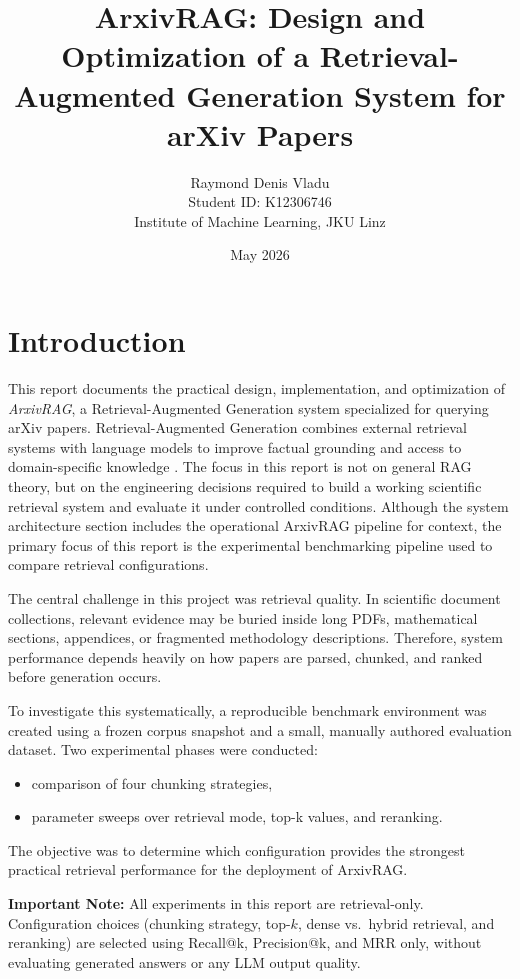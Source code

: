 \documentclass[a4paper,12pt]{article}
\title{ArxivRAG: Design and Optimization of a Retrieval-Augmented Generation System for arXiv Papers}
\author{
Raymond Denis Vladu \\
Student ID: K12306746 \\
Institute of Machine Learning, JKU Linz
}
\date{May 2026}
\begin{document}
\maketitle
\tableofcontents

\newpage

\section{Introduction}

This report documents the practical design, implementation, and optimization of \textit{ArxivRAG}, a Retrieval-Augmented Generation system specialized for querying arXiv papers. Retrieval-Augmented Generation combines external retrieval systems with language models to improve factual grounding and access to domain-specific knowledge \cite{lewis2020rag}. The focus in this report is not on general RAG theory, but on the engineering decisions required to build a working scientific retrieval system and evaluate it under controlled conditions. Although the system architecture section includes the operational ArxivRAG pipeline for context, the primary focus of this report is the experimental benchmarking pipeline used to compare retrieval configurations.

The central challenge in this project was retrieval quality. In scientific document collections, relevant evidence may be buried inside long PDFs, mathematical sections, appendices, or fragmented methodology descriptions. Therefore, system performance depends heavily on how papers are parsed, chunked, and ranked before generation occurs.

To investigate this systematically, a reproducible benchmark environment was created using a frozen corpus snapshot and a small, manually authored evaluation dataset. Two experimental phases were conducted:

\begin{itemize}
    \item comparison of four chunking strategies,
    \item parameter sweeps over retrieval mode, top-k values, and reranking.
\end{itemize}

The objective was to determine which configuration provides the strongest practical retrieval performance for the deployment of ArxivRAG.

\textbf{Important Note:} All experiments in this report are retrieval-only. Configuration choices (chunking strategy, top-$k$, dense vs.\ hybrid retrieval, and reranking) are selected using Recall@k, Precision@k, and MRR only, without evaluating generated answers or any LLM output quality.
\end{document}
